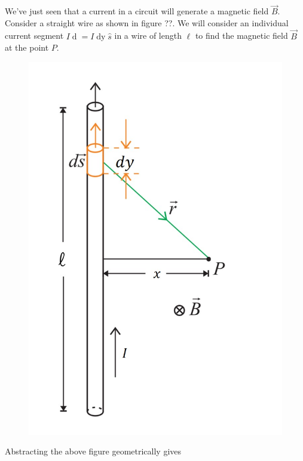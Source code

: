 We've just seen that a current in a circuit will generate a magnetic field $\vec{B}$. Consider a straight wire as shown in figure ??. We will consider an individual current segment $I \mathop{\mathrm{d}\vec{s}} = I \mathop{\mathrm{d}y} \hat{s}$ in a wire of length $\ell$ to find the magnetic field $\vec{B}$ at the point $P$. 

\begin{figure}[h!]
    \centering
    \includegraphics[scale=0.5]{notes/images/Magnetic-Field-Wire-P-1.JPG}
\end{figure}
\FloatBarrier

Abstracting the above figure geometrically gives

